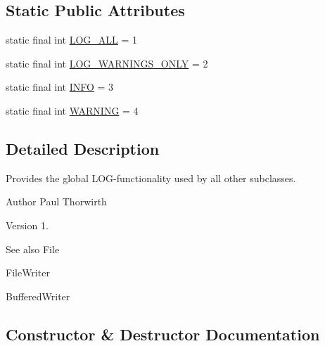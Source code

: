 \subsection*{Static Public Attributes}
\begin{DoxyCompactItemize}
\item 
static final int \hyperlink{classswp_1_1tuilmenau_1_1carduinodroid_1_1model_1_1_l_o_g_a6b06219c8e0a519560f2018b8662231b}{L\+O\+G\+\_\+\+A\+L\+L} = 1
\item 
static final int \hyperlink{classswp_1_1tuilmenau_1_1carduinodroid_1_1model_1_1_l_o_g_a2c91853552049e345b83f8b33245e18b}{L\+O\+G\+\_\+\+W\+A\+R\+N\+I\+N\+G\+S\+\_\+\+O\+N\+L\+Y} = 2
\item 
static final int \hyperlink{classswp_1_1tuilmenau_1_1carduinodroid_1_1model_1_1_l_o_g_a285227774afd8274aa42f99e99dc2a84}{I\+N\+F\+O} = 3
\item 
static final int \hyperlink{classswp_1_1tuilmenau_1_1carduinodroid_1_1model_1_1_l_o_g_a98c0b6a797efdb1fce0bc63410ce535d}{W\+A\+R\+N\+I\+N\+G} = 4
\end{DoxyCompactItemize}


\subsection{Detailed Description}
Provides the global L\+O\+G-\/functionality used by all other subclasses.

\begin{DoxyAuthor}{Author}
Paul Thorwirth 
\end{DoxyAuthor}
\begin{DoxyVersion}{Version}
1. 
\end{DoxyVersion}
\begin{DoxySeeAlso}{See also}
File 

File\+Writer 

Buffered\+Writer 
\end{DoxySeeAlso}


\subsection{Constructor \& Destructor Documentation}
\hypertarget{classswp_1_1tuilmenau_1_1carduinodroid_1_1model_1_1_l_o_g_a56023f651e46d2187d3103b08781c487}{}
